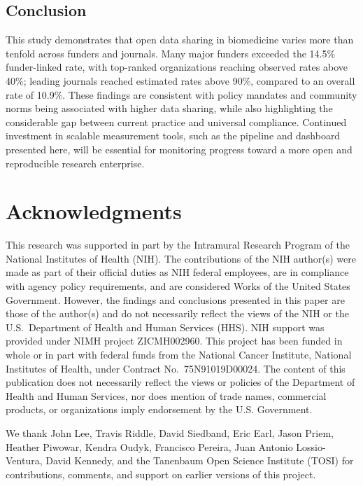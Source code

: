 \subsection{Conclusion}

This study demonstrates that open data sharing in biomedicine varies more than tenfold across funders and journals. Many major funders exceeded the 14.5\% funder-linked rate, with top-ranked organizations reaching observed rates above 40\%; leading journals reached estimated rates above 90\%, compared to an overall rate of 10.9\%. These findings are consistent with policy mandates and community norms being associated with higher data sharing, while also highlighting the considerable gap between current practice and universal compliance. Continued investment in scalable measurement tools, such as the pipeline and dashboard presented here, will be essential for monitoring progress toward a more open and reproducible research enterprise.


\section*{Acknowledgments}

This research was supported in part by the Intramural Research Program of the National Institutes of Health (NIH). The contributions of the NIH author(s) were made as part of their official duties as NIH federal employees, are in compliance with agency policy requirements, and are considered Works of the United States Government. However, the findings and conclusions presented in this paper are those of the author(s) and do not necessarily reflect the views of the NIH or the U.S.\ Department of Health and Human Services (HHS). NIH support was provided under NIMH project ZICMH002960. This project has been funded in whole or in part with federal funds from the National Cancer Institute, National Institutes of Health, under Contract No.\ 75N91019D00024. The content of this publication does not necessarily reflect the views or policies of the Department of Health and Human Services, nor does mention of trade names, commercial products, or organizations imply endorsement by the U.S. Government.

We thank John Lee, Travis Riddle, David Siedband, Eric Earl, Jason Priem, Heather Piwowar, Kendra Oudyk, Francisco Pereira, Juan Antonio Lossio-Ventura, David Kennedy, and the Tanenbaum Open Science Institute (TOSI) for contributions, comments, and support on earlier versions of this project.


